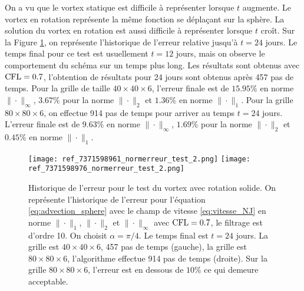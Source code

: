 On a vu que le vortex statique est difficile à représenter lorsque $t$ augmente. Le vortex en rotation représente la même fonction se déplaçant sur la sphère. La solution du vortex en rotation est aussi difficile à représenter lorsque $t$ croît. Sur la Figure \ref{fig:NJ24jours}, on représente l'historique de l'erreur relative jusqu'à $t=24$ jours. Le temps final pour ce test est usuellement $t=12$ jours, mais on observe le comportement du schéma sur un temps plus long. Les résultats sont obtenus avec $\text{CFL} = 0.7$, l'obtention de résultats pour 24 jours sont obtenus après 457 pas de temps. Pour la grille de taille $40 \times 40 \times 6$, l'erreur finale est de $15.95\%$ en norme $\| \cdot \|_{\infty}$, $3.67\%$ pour la norme $\| \cdot \|_{2}$ et $1.36\%$ en norme $\| \cdot \|_{1}$. Pour la grille $80 \times 80 \times 6$, on effectue 914 pas de temps pour arriver au temps $t=24$ jours. L'erreur finale est de $9.63\%$ en norme $\| \cdot \|_{\infty}$, $1.69\%$ pour la norme $\| \cdot \|_{2}$ et $0.45\%$ en norme $\| \cdot \|_{1}$.

\begin{figure}[htbp]
\begin{center}
\texttt{[image: ref\_7371598961\_normerreur\_test\_2.png]}
\texttt{[image: ref\_7371598976\_normerreur\_test\_2.png]}
\end{center}
\caption{Historique de l'erreur pour le test du vortex avec rotation solide. On représente l'historique de l'erreur pour l'équation \eqref{eq:advection_sphere} avec le champ de vitesse \eqref{eq:vitesse_NJ} en norme $\| \cdot \|_1$, $\| \cdot \|_2$ et $\| \cdot \|_{\infty}$ avec $\text{CFL} = 0.7$, le filtrage est d'ordre 10. On choisit $\alpha = \pi/4$. Le temps final est $t=24$ jours. La grille est $40 \times 40  \times 6$, 457 pas de temps (gauche), la grille est $80 \times 80  \times 6$, l'algorithme effectue 914 pas de temps (droite). Sur la grille $80 \times 80 \times 6$, l'erreur est en dessous de $10 \%$ ce qui demeure acceptable.}
\label{fig:NJ24jours}
\end{figure} 

